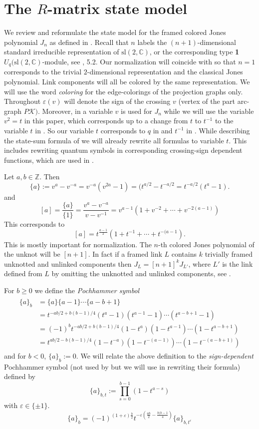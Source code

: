 \documentclass[11pt]{article}
\theoremstyle{definition}
\theoremstyle{remark}
\theoremstyle{remark}
\begin{document}
\section{The $R$-matrix state model}

We review and reformulate the state model for the framed colored Jones polynomial $J_n$ as defined in \cite{G}. Recall that $n$ labels the $(n+1)$-dimensional standard irreducible representation of $\textrm{sl}(2,\mathbb{C})$, or the corresponding type \textbf{1} $U_q(\textrm{sl}(2,\mathbb{C})$-module, see \cite{J}, 5.2.
 Our normalization will coincide with \cite{GL} so that $n=1$ corresponds to the trivial $2$-dimensional representation and the classical Jones polynomial. Link components will all be colored by the same representation. We will use the word \textit{coloring} for the edge-colorings of the projection graphs only.
Throughout $\varepsilon (v)$ will denote the sign of the crossing $v$ (vertex of the part arc-graph $P\mathcal{K})$. Moreover, in \cite{G} a variable $v$ is used for $J_n$ while we will use the variable $v^2=t$ in this paper, which corresponds up to a change from $t$ to $t^{-1}$ to the variable $t$ in \cite{GL}. So our variable $t$ corresponds to $q$ in \cite{G} and $t^{-1}$ in \cite{GL}.
While describing the state-sum formula of \cite{G} we will already rewrite all formulas to variable $t$. This includes rewriting quantum symbols in corresponding crossing-sign dependent functions, which are used in \cite{GL}.

Let $a,b\in \mathbb{Z}$. Then
$$\{a\}:=v^a-v^{-a}=v^{-a}(v^{2a}-1)=( t^{a/2}-t^{-a/2}=t^{-a/2}(t^a-1).$$
and 
$$[a]=\frac{\{a\}}{\{1\}}=\frac{v^a-v^{-a}}{v-v^{-1}}=v^{a-1}(1+v^{-2}+\cdots +v^{-2(a-1)})$$
This corresponds to
$$[a]=t^{\frac{a-1}{2}}(1+t^{-1}+\cdots +t^{-(a-1}).$$
This is mostly important for normalization. The $n$-th colored Jones polynomial of the unknot will be $[n+1]$.
In fact if a framed link $L$ contains $k$ trivially framed unknotted and unlinked components then $J_L=[n+1]^kJ_{L'}$, where $L'$ is the link defined from $L$ by omitting the unknotted and unlinked components, see \cite{G}. 

For $b\geq 0$ we define the \textit{Pochhammer symbol}
\begin{align*}
\begin{split}
\{a\}_b&=\{a\}\{a-1\}\cdots \{a-b+1\}\\
&=t^{-ab/2+b(b-1)/4}(t^a-1)(t^{a-1}-1)\cdots (t^{a-b+1}-1) \\
&=(-1)^bt^{-ab/2+b(b-1)/4}(1-t^a)(1-t^{a-1})\cdots (1-t^{a-b+1}) \\
&=t^{ab/2-b(b-1)/4}(1-t^{-a})(1-t^{-(a-1)})\cdots (1-t^{-(a-b+1)})
\end{split}
\end{align*}
and for $b<0$, $\{a\}_b:=0$. 
We will relate the above definition to the \textit{sign-dependent} Pochhammer symbol (not used by \cite{GL} but we will use in rewriting their formula) defined by
$$\{a\}_{b,t}:=\prod_{s=0}^{b-1}(1-t^{a-s})$$
with $\varepsilon \in \{\pm 1\}$.
\begin{equation}\label{eq=Pochhammer}
\{a\}_b=(-1)^{(1+\varepsilon )\frac{b}{2}}t^{-\varepsilon (\frac{ab}{2}-\frac{b(b-1}{4})}\{a\}_{b,t^{\varepsilon }}
\end{equation}
\end{document}
